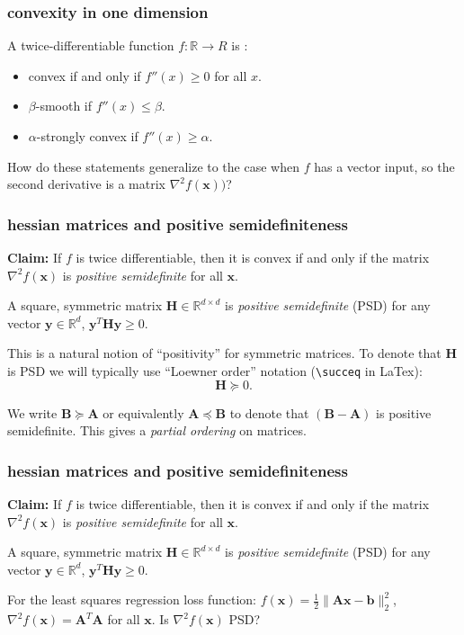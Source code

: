 \documentclass[compress]{beamer}
\newcommand{\bv}[1]{\mathbf{#1}}
\newcommand{\R}{\mathbb{R}}
\begin{document}
\begin{frame}[t]
	\frametitle{convexity in one dimension}
	A twice-differentiable function $f:\R\rightarrow R$ is :
	\begin{itemize}
		\item convex if and only if $f''(x)\geq 0$ for all $x$.
		\item $\beta$-smooth if $f''(x) \leq \beta$. 
		\item $\alpha$-strongly convex if $f''(x) \geq \alpha$. 
	\end{itemize}
	\vspace{8em}
	How do these statements generalize to the case when $f$ has a vector input, so the second derivative is a matrix $\nabla^2f(\bv{x}))$?
\end{frame}


\begin{frame}[t]
	\frametitle{hessian matrices and positive semidefiniteness}
	\textbf{Claim:} If $f$ is twice differentiable, then it is convex if and only if the matrix $\nabla^2 f(\bv{x})$ is \emph{positive semidefinite} for all $\bv{x}$. 
	
	\begin{definition}
		A square, symmetric matrix $\bv{H}\in \R^{d\times d}$ is \emph{positive semidefinite} (PSD) for any vector $\bv{y}\in \R^d$, $\bv{y}^T\bv{H}\bv{y} \geq 0$. 
	\end{definition}
	
	This is a natural notion of ``positivity'' for symmetric matrices. To denote that $\bv{H}$ is PSD we will typically use ``Loewner order'' notation (\texttt{\textbackslash succeq} in LaTex): $$\bv{H}\succeq 0.$$
	
	We write $\bv{B}\succeq \bv{A}$ or equivalently  $\bv{A}\preceq \bv{B}$ to denote that $(\bv{B} - \bv{A})$ is positive semidefinite. This gives a \emph{partial ordering} on matrices.
\end{frame}

\begin{frame}[t]
	\frametitle{hessian matrices and positive semidefiniteness}
	\textbf{Claim:} If $f$ is twice differentiable, then it is convex if and only if the matrix $\nabla^2 f(\bv{x})$ is \emph{positive semidefinite} for all $\bv{x}$. 
	
	\begin{definition}
		A square, symmetric matrix $\bv{H}\in \R^{d\times d}$ is \emph{positive semidefinite} (PSD) for any vector $\bv{y}\in \R^d$, $\bv{y}^T\bv{H}\bv{y} \geq 0$. 
	\end{definition}
	
	For the least squares regression loss function: $f(\bv{x}) = \frac{1}{2}\|\bv{A}\bv{x} - \bv{b}\|_2^2$, $\nabla^2 f(\bv{x})= \bv{A}^T\bv{A}$ for all $\bv{x}$. Is $\nabla^2 f(\bv{x})$ PSD?
\end{frame}
\end{document}
